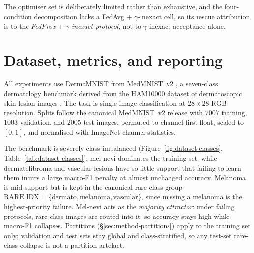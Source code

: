 \documentclass[11pt,a4paper]{report}
\begin{document}
The optimiser set is deliberately limited rather than exhaustive, and the
four-condition decomposition lacks a FedAvg $+$ $\gamma$-inexact cell, so its
rescue attribution is to the \emph{FedProx $+$ $\gamma$-inexact protocol}, not to
$\gamma$-inexact acceptance alone.

\section{Dataset, metrics, and reporting}
\label{sec:method-dataset}
\label{sec:method-metrics}

All experiments use DermaMNIST from MedMNIST~v2 \citep{yang2023medmnistv2}, a
seven-class dermatology benchmark derived from the HAM10000 dataset of
dermatoscopic skin-lesion images \citep{tschandl2018ham10000}. The task is
single-image classification at $28 \times 28$ RGB resolution. Splits follow the
canonical MedMNIST~v2 release with $7007$ training, $1003$ validation, and $2005$
test images, permuted to channel-first float, scaled to $[0, 1]$, and normalised
with ImageNet channel statistics.

The benchmark is severely class-imbalanced (Figure~\ref{fig:dataset-classes},
Table~\ref{tab:dataset-classes}): mel-nevi dominates the training set, while
dermatofibroma and vascular lesions have so little support that failing to learn
them incurs a large macro-F1 penalty at almost unchanged accuracy. Melanoma is
mid-support but is kept in the canonical rare-class group
$\mathrm{RARE\_IDX} = \{\text{dermato}, \text{melanoma}, \text{vascular}\}$, since
missing a melanoma is the highest-priority failure. Mel-nevi acts as the
\emph{majority attractor}: under failing protocols, rare-class images are routed
into it, so accuracy stays high while macro-F1 collapses. Partitions
(\S\ref{sec:method-partitions}) apply to the training set only; validation and test
sets stay global and class-stratified, so any test-set rare-class collapse is not a
partition artefact.
\end{document}
